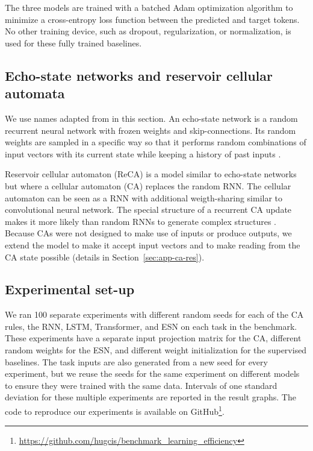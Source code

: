 The three models are trained with a batched Adam optimization algorithm
\parencite{kingmaAdamMethodStochastic2015} to minimize a cross-entropy loss function
between the predicted and target tokens. No other training device, such as
dropout, regularization, or normalization, is used for these fully trained baselines.

\subsection{Echo-state networks and reservoir cellular automata\label{sec:echo-state-networks}}

We use %
names adapted from \parencite{jaegerLongShortTermMemory2012} in
this section. An echo-state network is a random recurrent neural network with
frozen weights and skip-connections. Its random weights are sampled in a
specific way so that it performs random combinations of input vectors with its
current state while keeping a history of past inputs \parencite{jaegerEchoStateApproach2001}.


Reservoir cellular automaton (ReCA) is a model similar to echo-state networks
but where a cellular automaton (CA) replaces the random RNN. The cellular
automaton can be seen as a \ac{RNN} with additional weigth-sharing similar to
convolutional neural network. The special structure of a recurrent CA update
makes it more likely than random RNNs to generate complex structures
\parencite{wolframStatisticalMechanicsCellular1983, wolframNewKindScience2002}.
Because CAs were not designed to make use of inputs or produce outputs, we
extend the model to make it accept input vectors and to make reading from the CA
state possible (details in Section~\ref{sec:app-ca-res}).

\subsection{Experimental set-up}
We ran 100 separate experiments with different random seeds for each of the CA
rules, the RNN, LSTM, Transformer, and ESN on each task in the benchmark. These experiments
have a separate input projection matrix for the CA, different random weights
for the ESN, and different weight initialization for the supervised baselines.
The task inputs are also generated from a new seed for every experiment, but
we reuse the seeds for the same experiment on different models to ensure they
were trained with the same data. Intervals of one standard deviation for these multiple
experiments are reported in the result graphs.
The code to reproduce our experiments is
available on GitHub\footnote{\url{https://github.com/hugcis/benchmark_learning_efficiency}}.


